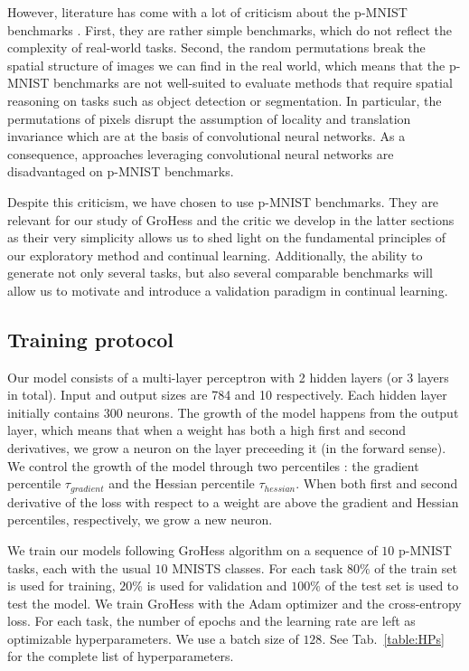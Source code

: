 \documentclass[11pt]{article}
\begin{document}
\vspace{2mm}
\noindent
However, literature has come with a lot of criticism about the p-MNIST benchmarks \cite{frameworks_1_pMNIST_critic_1}\cite{pMNIST_critic_2}. First, they are rather simple benchmarks, which do not reflect the complexity of real-world tasks. Second, the random permutations break the spatial structure of images we can find in the real world, which means that the p-MNIST benchmarks are not well-suited to evaluate methods that require spatial reasoning on tasks such as object detection or segmentation. In particular, the permutations of pixels disrupt the assumption of locality and translation invariance which are at the basis of convolutional neural networks. As a consequence, approaches leveraging convolutional neural networks are disadvantaged on p-MNIST benchmarks.

\vspace{2mm}
\noindent
Despite this criticism, we have chosen to use p-MNIST benchmarks. They are relevant for our study of GroHess and the critic we develop in the latter sections as their very simplicity allows us to shed light on the fundamental principles of our exploratory method and continual learning. Additionally, the ability to generate not only several tasks, but also several comparable benchmarks will allow us to motivate and introduce a validation paradigm in continual learning.


\subsection{Training protocol} \label{sec:training_protocol}


Our model consists of a multi-layer perceptron with 2 hidden layers (or 3 layers in total). Input and output sizes are 784 and 10 respectively. Each hidden layer initially contains 300 neurons. The growth of the model happens from the output layer, which means that when a weight has both a high first and second derivatives, we grow a neuron on the layer preceeding it (in the forward sense). We control the growth of the model through two percentiles : the gradient percentile $\tau_{gradient}$ and the Hessian percentile $\tau_{hessian}$. When both first and second derivative of the loss with respect to a weight are above the gradient and Hessian percentiles, respectively, we grow a new neuron. 

\vspace{2mm}
\noindent
We train our models following GroHess algorithm on a sequence of $10$ p-MNIST tasks, each with the usual $10$ MNISTS classes. For each task $80\%$ of the train set is used for training, $20\%$ is used for validation and $100\%$ of the test set is used to test the model. We train GroHess with the Adam optimizer and the cross-entropy loss. For each task, the number of epochs and the learning rate are left as optimizable hyperparameters. We use a batch size of $128$. See Tab.~\ref{table:HPs} for the complete list of hyperparameters.
\end{document}

